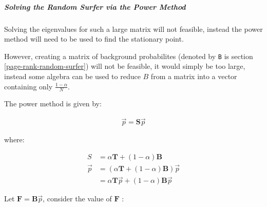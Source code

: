 \documentclass[11pt]{article}
\begin{document}
\subparagraph{Solving the Random Surfer via the Power Method}
\label{sec:org7f3bd4f}
Solving the eigenvalues for such a large matrix will not feasible, instead the power method will need to be used to find the stationary point.

However, creating a matrix of background probabilites (denoted by \texttt{B} is section \ref{page-rank-random-surfer}) will not be feasible, it would simply be too large, instead some algebra can be used to reduce \(B\) from a matrix into a vector containing only \(\frac{1-\alpha}{N}\).

The power method is given by:

\begin{align}
\vec{p}= \mathbf{S} \vec{p}
\end{align}

where:

\begin{align}
S &= \alpha \mathbf{T} +  \left( 1 - \alpha \right) \mathbf{B} \\
\vec{p} &= \left( \alpha \mathbf{T} +  \left( 1 - \alpha \right) \mathbf{B} \right) \vec{p}\\
&= \alpha \mathbf{T}\vec{p} +  \left( 1-\alpha \right) \mathbf{B} \vec{p}
\end{align}

Let \(\mathbf{F}= \mathbf{B}\vec{p}\), consider the value of \(\mathbf{F}\) :
\end{document}

